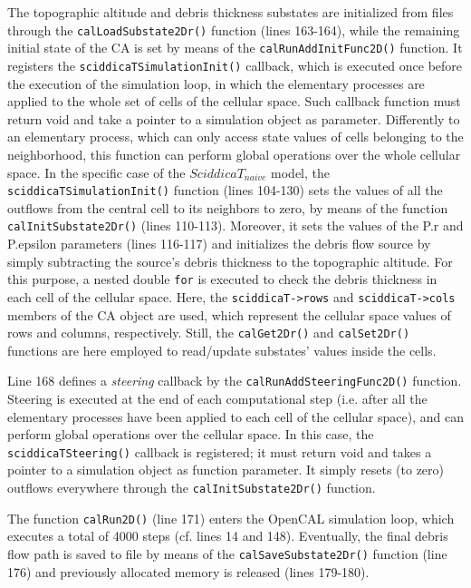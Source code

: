 The topographic altitude and debris thickness substates are
initialized from files through the \verb'calLoadSubstate2Dr()'
function (lines 163-164), while the remaining initial state of the CA
is set by means of the \verb'calRunAddInitFunc2D()' function. It
registers the \verb'sciddicaTSimulationInit()' callback, which is
executed once before the execution of the simulation loop, in which
the elementary processes are applied to the whole set of cells of the
cellular space. Such callback function must return void and take a
pointer to a simulation object as parameter. Differently to an
elementary process, which can only access state values of cells
belonging to the neighborhood, this function can perform global
operations over the whole cellular space. In the specific case of the
$SciddicaT_{naive}$ model, the \verb'sciddicaTSimulationInit()' function
(lines 104-130) sets the values of all the outflows from the central
cell to its neighbors to zero, by means of the function
\verb'calInitSubstate2Dr()' (lines 110-113). Moreover, it sets the
values of the P.r and P.epsilon parameters (lines 116-117) and
initializes the debris flow source by simply subtracting the source's
debris thickness to the topographic altitude. For this purpose, a
nested double \verb'for' is executed to check the debris thickness in each
cell of the cellular space. Here, the \verb'sciddicaT->rows' and
\verb'sciddicaT->cols' members of the CA object are used, which
represent the cellular space values of rows and columns,
respectively. Still, the \verb'calGet2Dr()' and \verb'calSet2Dr()'
functions are here employed to read/update substates' values inside
the cells.

Line 168 defines a \emph{steering} callback by
the \verb'calRunAddSteeringFunc2D()' function. Steering is executed at
the end of each computational step (i.e. after all the elementary
processes have been applied to each cell of the cellular space), and
can perform global operations over the cellular space. In this case,
the \verb'sciddicaTSteering()' callback is registered; it must
return void and takes a pointer to a simulation object as function
parameter. It simply resets (to zero) outflows everywhere through
the \verb'calInitSubstate2Dr()' function.

The function \verb'calRun2D()' (line 171) enters the OpenCAL
simulation loop, which executes a total of 4000 steps (cf. lines 14
and 148). Eventually, the final debris flow path is saved to file by
means of the \verb'calSaveSubstate2Dr()' function (line 176) and
previously allocated memory is released (lines 179-180).

